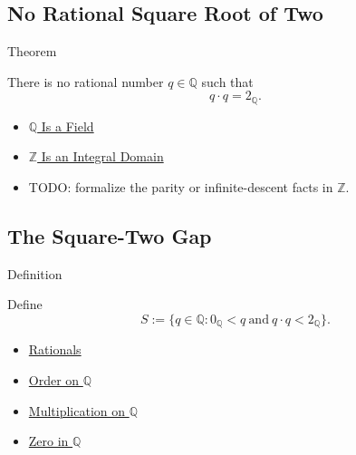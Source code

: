 \subsection*{No Rational Square Root of Two}

\begin{theorembox}{Theorem}
\begin{theorem}
\label{thm:no-rational-square-root-of-two}
There is no rational number $q\in\mathbb{Q}$ such that
\[
q\cdot q=2_{\mathbb{Q}}.
\]
\end{theorem}
\end{theorembox}

\begin{dependencies}
\begin{itemize}
  \item \hyperref[thm:q-is-a-field]{$\mathbb{Q}$ Is a Field}
  \item \hyperref[thm:z-integral-domain]{$\mathbb{Z}$ Is an Integral Domain}
  \item TODO: formalize the parity or infinite-descent facts in $\mathbb{Z}$.
\end{itemize}
\end{dependencies}

\subsection*{The Square-Two Gap}

\begin{definitionbox}{Definition}
\begin{definition}
\label{def:gap-set-q}
Define
\[
S:=\{q\in\mathbb{Q}:0_{\mathbb{Q}}<q\ \text{and}\ q\cdot q<2_{\mathbb{Q}}\}.
\]
\end{definition}
\end{definitionbox}

\begin{dependencies}
\begin{itemize}
  \item \hyperref[def:rationals]{Rationals}
  \item \hyperref[def:order-on-q]{Order on $\mathbb{Q}$}
  \item \hyperref[def:multiplication-on-q-classes]{Multiplication on $\mathbb{Q}$}
  \item \hyperref[def:zero-in-q]{Zero in $\mathbb{Q}$}
\end{itemize}
\end{dependencies}


